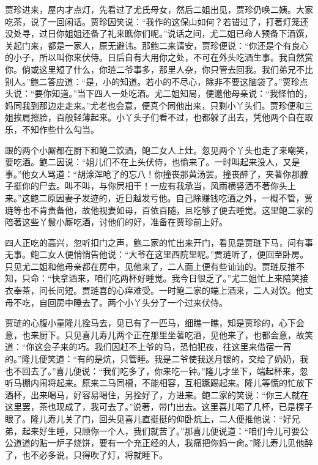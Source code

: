 \begin{parag}
    贾珍进来，屋内才点灯，先看过了尤氏母女，然后二姐出见，贾珍仍唤二姨。大家吃茶，说了一回闲话。贾珍因笑说：“我作的这保山如何？若错过了，打著灯笼还没处寻，过日你姐姐还备了礼来瞧你们呢。”说话之间，尤二姐已命人预备下酒馔，关起门来，都是一家人，原无避讳。那鲍二来请安，贾珍便说：“你还是个有良心的小子，所以叫你来伏侍。日后自有大用你之处，不可在外头吃酒生事。我自然赏你。倘或这里短了什么，你琏二爷事多，那里人杂，你只管去回我。我们弟兄不比别人。”鲍二答应道：“是，小的知道。若小的不尽心，除非不要这脑袋了。”贾珍点头说：“要你知道。”当下四人一处吃酒。尤二姐知局，便邀他母亲说：“我怪怕的，妈同我到那边走走来。”尤老也会意，便真个同他出来，只剩小丫头们。贾珍便和三姐挨肩擦脸，百般轻薄起来。小丫头子们看不过，也都躲了出去，凭他两个自在取乐，不知作些什么勾当。
\end{parag}


\begin{parag}
    跟的两个小厮都在厨下和鲍二饮酒，鲍二女人上灶。忽见两个丫头也走了来嘲笑，要吃酒。鲍二因说：“姐儿们不在上头伏侍，也偷来了。一时叫起来没人，又是事。”他女人骂道：“胡涂浑呛了的忘八！你撞丧那黄汤罢。撞丧醉了，夹著你那膫子挺你的尸去。叫不叫，与你屄相干！一应有我承当，风雨横竖洒不著你头上来。”这鲍二原因妻子发迹的，近日越发亏他。自己除赚钱吃酒之外，一概不管，贾琏等也不肯责备他，故他视妻如母，百依百随，且吃够了便去睡觉。这里鲍二家的陪著这些丫鬟小厮吃酒，讨他们的好，准备在贾珍前上好。
\end{parag}


\begin{parag}
    四人正吃的高兴，忽听扣门之声，鲍二家的忙出来开门，看见是贾琏下马，问有事无事。鲍二女人便悄悄告他说：“大爷在这里西院里呢。”贾琏听了，便回至卧房。只见尤二姐和他母亲都在房中，见他来了，二人面上便有些讪讪的。贾琏反推不知，只命：“快拿酒来，咱们吃两杯好睡觉。我今日很乏了。”尤二姐忙上来陪笑接衣奉茶，问长问短。贾琏喜的心痒难受。一时鲍二家的端上酒来，二人对饮。他丈母不吃，自回房中睡去了。两个小丫头分了一个过来伏侍。
\end{parag}


\begin{parag}
    贾琏的心腹小童隆儿拴马去，见已有了一匹马，细瞧一瞧，知是贾珍的，心下会意，也来厨下。只见喜儿寿儿两个正在那里坐著吃酒，见他来了，也都会意，故笑道：“你这会子来的巧。我们因赶不上爷的马，恐怕犯夜，往这里来借宿一宵的。”隆儿便笑道：“有的是炕，只管睡。我是二爷使我送月银的，交给了奶奶，我也不回去了。”喜儿便说：“我们吃多了，你来吃一钟。”隆儿才坐下，端起杯来，忽听马棚内闹将起来。原来二马同槽，不能相容，互相蹶踢起来。隆儿等慌的忙放下酒杯，出来喝马，好容易喝住，另拴好了，方进来。鲍二家的笑说：“你三人就在这里罢，茶也现成了，我可去了。”说著，带门出去。这里喜儿喝了几杯，已是楞子眼了。隆儿寿儿关了门，回头见喜儿直挺挺的仰卧炕上，二人便推他说：“好兄弟，起来好生睡，只顾你一个人，我们就苦了。”那喜儿便说道：“咱们今儿可要公公道道的贴一炉子烧饼，要有一个充正经的人，我痛把你妈一肏。”隆儿寿儿见他醉了，也不必多说，只得吹了灯，将就睡下。
\end{parag}


